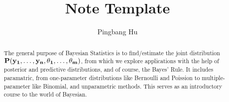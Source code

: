 \documentclass[a4paper]{report}
\author{Pingbang Hu}
\title{Note Template}
\begin{document}
\maketitle

\begin{abstract}
	The general purpose of Bayesian Statistics is to find/estimate the joint distribution $\bf{P}(y_1, \ldots, y_n, \theta_1, \ldots, \theta_m)$, from which we explore applications with the help of posterior and predictive distributions, and of course, the Bayes' Rule. It includes paramatric, from one-parameter distributions like Bernoulli and Poission to multiple-parameter like Binomial, and unparametric methods. This serves as an introductory course to the world of Bayesian.
\end{abstract}

\newpage

\tableofcontents

\newpage




\appendix
\appendixpage


\newpage
\printbibliography
\end{document}

